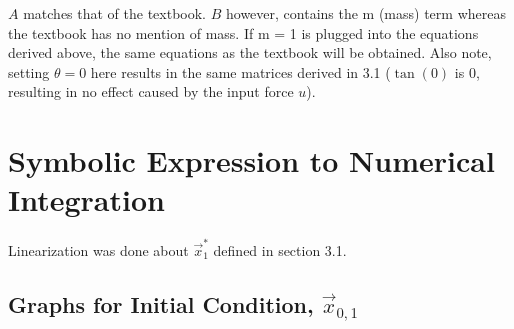 \documentclass[10pt]{article}
\begin{document}
$A$ matches that of the textbook. $B$ however, contains the m (mass) term whereas the textbook has no mention of mass. If m = 1 is plugged into the equations derived above, the same equations as the textbook will be obtained. Also note, setting $\theta = 0$ here results in the same matrices derived in 3.1 ($\tan(0)$ is 0, resulting in no effect caused by the input force $u$).

\section{Symbolic Expression to Numerical Integration}
Linearization was done about $\vec{x}_1^*$ defined in {}section 3.1.

\subsection{Graphs for Initial Condition, \texorpdfstring{$\vec{x}_{0,1}$}{x01}}
\end{document}
